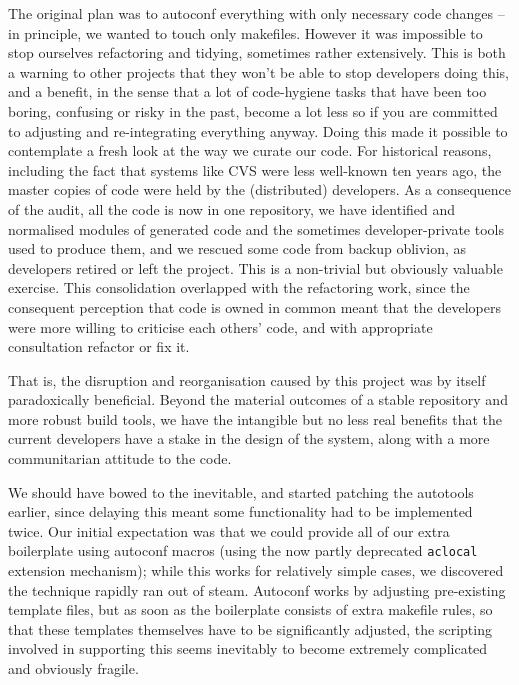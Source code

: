 \documentclass{speauth}
\begin{document}
The original plan was to autoconf everything with only necessary code
changes -- in principle, we wanted to touch only makefiles.  However
it was impossible to stop ourselves refactoring and tidying, sometimes
rather extensively.  This is both a warning to other projects that
they won't be able to stop developers doing this, and a benefit, in
the sense that a lot of code-hygiene tasks that have been too boring,
confusing or risky in the past, become a lot less so if you are
committed to adjusting and re-integrating everything anyway.  Doing
this made it possible to contemplate a fresh look at the way we curate
our code.  For historical reasons, including the fact that systems
like CVS were less well-known ten years ago, the master copies of code
were held by the (distributed) developers.  As a consequence of the
audit, all the code is now in one repository, we have identified and
normalised modules of generated code and the sometimes
developer-private tools used to produce them, and we rescued some code
from backup oblivion, as developers retired or left the project.  This
is a non-trivial but obviously valuable exercise.  This consolidation
overlapped with the refactoring work, since the consequent perception
that code is owned in common meant that the developers were more
willing to criticise each others' code, and with appropriate
consultation refactor or fix it.

That is, the disruption and reorganisation caused by this project was
by itself paradoxically beneficial.  Beyond the material outcomes of a
stable repository and more robust build tools, we have the intangible
but no less real benefits that the current developers have a stake in
the design of the system, along with a more communitarian attitude to
the code.

We should have bowed to the inevitable, and started patching the
autotools earlier, since delaying this meant some functionality had to
be implemented twice.  Our initial expectation was that we could
provide all of our extra boilerplate using autoconf macros (using the
now partly deprecated \texttt{aclocal} extension mechanism); while
this works for relatively simple cases, we discovered the technique
rapidly ran out of steam.  Autoconf
works by adjusting pre-existing template files, but as soon as the
boilerplate consists of extra makefile rules, so that these templates
themselves have to be significantly adjusted, the scripting involved
in supporting this seems inevitably to become extremely complicated
and obviously fragile.
\end{document}
